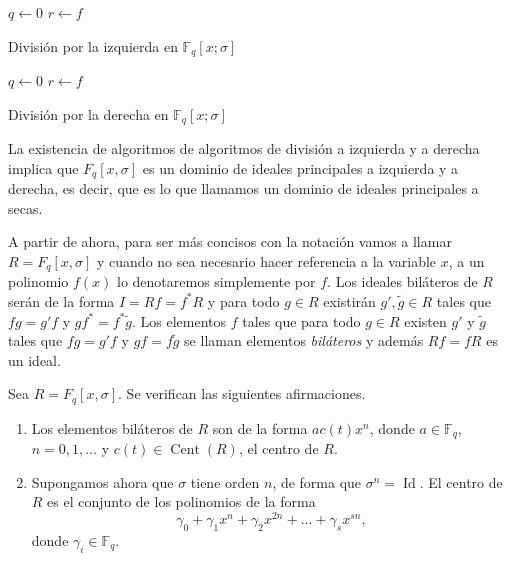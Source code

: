 \begin{Ualgorithm}[h]
  \DontPrintSemicolon
  \(q \longleftarrow 0\)\;
  \(r \longleftarrow f\)\;
    \caption{División por la izquierda en \(\mathbb F_q[x; \sigma]\)}
  \label{alg:ore-fq-division-izquierda}
\end{Ualgorithm}

\begin{Ualgorithm}[h]
  \DontPrintSemicolon
  \(q \longleftarrow 0\)\;
  \(r \longleftarrow f\)\;
    \caption{División por la derecha en \(\mathbb F_q[x; \sigma]\)
  }
  \label{alg:ore-fq-division-derecha}
\end{Ualgorithm}

La existencia de algoritmos de algoritmos de división a izquierda y a derecha implica que \(F_q[x, \sigma]\) es un dominio de ideales principales a izquierda y a derecha, es decir, que es lo que llamamos un dominio de ideales principales a secas.

A partir de ahora, para ser más concisos con la notación vamos a llamar \(R = F_q[x, \sigma]\) y cuando no sea necesario hacer referencia a la variable \(x\), a un polinomio \(f(x)\) lo denotaremos simplemente por \(f\).
Los ideales biláteros de \(R\) serán de la forma \(I = Rf = f^{*}R\) y para todo \(g \in R\) existirán \(g', \tilde{g} \in R\) tales que \(fg = g'f\) y \(gf^{*} = f^{*}\tilde{g}\).
Los elementos \(f\) tales que para todo \(g \in R\) existen \(g'\) y \(\tilde{g}\) tales que \(fg = g'f\) y \(gf = f\tilde{g}\) se llaman elementos \emph{biláteros} y además \(Rf = fR\) es un ideal.

\begin{theorem}
  \label{th:anillos-ore-centro}
  Sea \(R = F_q[x, \sigma]\). Se verifican las siguientes afirmaciones.
  \begin{enumerate}
    \item Los elementos biláteros de \(R\) son de la forma \(ac(t)x^n\), donde \(a \in \mathbb F_q\), \(n = 0, 1, \dots\) y \(c(t) \in \operatorname{Cent}(R)\), el centro de \(R\).
    \item Supongamos ahora que \(\sigma\) tiene orden \(n\), de forma que \(\sigma^n = \operatorname{Id}\).
    El centro de \(R\) es el conjunto de los polinomios de la forma
    \[
      \gamma_0 + \gamma_1x^{n} + \gamma_2x^{2n} + \dots + \gamma_sx^{sn},
    \]
    donde \(\gamma_i \in \mathbb F_q\).
  \end{enumerate}
\end{theorem}

